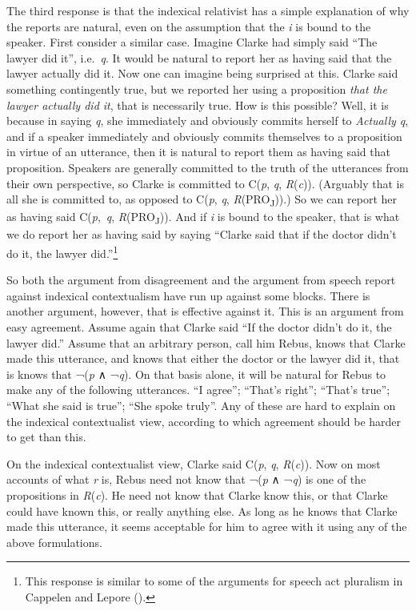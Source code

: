 \documentclass[
  10pt,
  letterpaper,
  DIV=11,
  numbers=noendperiod,
  twoside]{scrartcl}
\begin{document}
The third response is that the indexical relativist has a simple
explanation of why the reports are natural, even on the assumption that
the \emph{i} is bound to the speaker. First consider a similar case.
Imagine Clarke had simply said ``The lawyer did it'', i.e.~\emph{q}. It
would be natural to report her as having said that the lawyer actually
did it. Now one can imagine being surprised at this. Clarke said
something contingently true, but we reported her using a proposition
\emph{that the lawyer actually did it}, that is necessarily true. How is
this possible? Well, it is because in saying \emph{q}, she immediately
and obviously commits herself to \emph{Actually q}, and if a speaker
immediately and obviously commits themselves to a proposition in virtue
of an utterance, then it is natural to report them as having said that
proposition. Speakers are generally committed to the truth of the
utterances from their own perspective, so Clarke is committed to
C(\emph{p}, \emph{q}, \emph{R}(\emph{c})). (Arguably that is all she is
committed to, as opposed to C(\emph{p}, \emph{q},
\emph{R}(PRO\textsubscript{J})).) So we can report her as having said
C(\emph{p},~\emph{q}, \emph{R}(PRO\textsubscript{J})). And if \emph{i}
is bound to the speaker, that is what we do report her as having said by
saying ``Clarke said that if the doctor didn't do it, the lawyer
did.''\footnote{This response is similar to some of the arguments for
  speech act pluralism in Cappelen and Lepore
  ().}

So both the argument from disagreement and the argument from speech
report against indexical contextualism have run up against some blocks.
There is another argument, however, that is effective against it. This
is an argument from easy agreement. Assume again that Clarke said ``If
the doctor didn't do it, the lawyer did.'' Assume that an arbitrary
person, call him Rebus, knows that Clarke made this utterance, and knows
that either the doctor or the lawyer did it, that is knows that
¬(\emph{p} ∧ ¬\emph{q}). On that basis alone, it will be natural for
Rebus to make any of the following utterances. ``I agree''; ``That's
right''; ``That's true''; ``What she said is true''; ``She spoke
truly''. Any of these are hard to explain on the indexical contextualist
view, according to which agreement should be harder to get than this.

On the indexical contextualist view, Clarke said C(\emph{p}, \emph{q},
\emph{R}(\emph{c})). Now on most accounts of what \emph{r} is, Rebus
need not know that ¬(\emph{p} ∧ ¬\emph{q}) is one of the propositions in
\emph{R}(\emph{c}). He need not know that Clarke know this, or that
Clarke could have known this, or really anything else. As long as he
knows that Clarke made this utterance, it seems acceptable for him to
agree with it using any of the above formulations.
\end{document}
